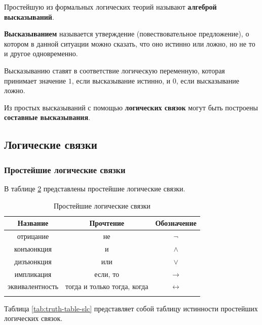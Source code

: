\documentclass[a5paper, 11pt]{extarticle}
\theoremstyle{definition}
\theoremstyle{definition}
\theoremstyle{definition}
\numberwithin{figure}{section}
\numberwithin{table}{section}
\begin{document}
Простейшую из формальных логических теорий называют \textbf{алгеброй высказываний}.

\textbf{Высказыванием} называется утверждение (повествовательное предложение), о котором в данной ситуации можно сказать, что оно истинно или ложно, но не то и другое одновременно.

Высказыванию ставят в соответствие логическую переменную, которая принимает значение \(1\), если высказывание истинно, и \(0\), если высказывание ложно.

Из простых высказываний с помощью \textbf{логических связок} могут быть построены \textbf{составные высказывания}.

\subsection{Логические связки}

\subsubsection{Простейшие логические связки}

В таблице \ref{tab:simplest-logical-connectives} представлены простейшие логические связки.

\begin{table}[H]
    \renewcommand*{\arraystretch}{1.5}
    \begin{longtable}{|c|c|c|}
        \hline
        \textbf{Название} & \textbf{Прочтение}          & \textbf{Обозначение} \\
        \hline
        отрицание         & не                          & \(\lnot\)            \\
        \hline
        конъюнкция        & и                           & \(\land\)            \\
        \hline
        дизъюнкция        & или                         & \(\lor\)             \\
        \hline
        импликация        & если, то                    & \(\to\)              \\
        \hline
        эквивалентность   & тогда и только тогда, когда & \(\leftrightarrow\)  \\
        \hline
        \caption{Простейшие логические связки}
        \label{tab:simplest-logical-connectives}
    \end{longtable}
\end{table}

Таблица \ref{tab:truth-table-slc} представляет собой таблицу истинности простейших логических связок.
\end{document}
